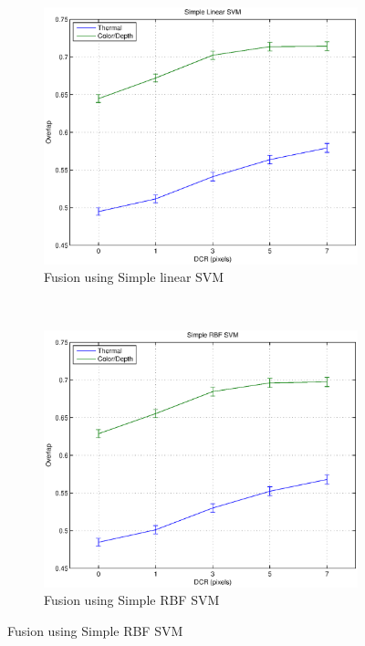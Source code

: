 \documentclass[10pt,twocolumn,letterpaper]{article}
\begin{document}
\begin{figure}[ht]
	 \\
	\begin{subfigure}[b]{0.47\textwidth}
 		\includegraphics[width=1\textwidth]{results/simplelinearsvm.eps} 			
		\caption{Fusion using Simple linear SVM}
    		\label{fig:simplelinearsvm}
 	\end{subfigure}
	~
	\begin{subfigure}[b]{0.47\textwidth}
 		\includegraphics[width=1\textwidth]{results/simplerbfsvm.eps} 			
		\caption{Fusion using Simple RBF SVM}
    		\label{fig:simplerbfsvm}
 	\end{subfigure}

\end{figure}
\end{document}
